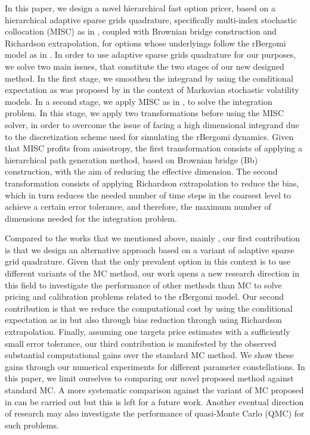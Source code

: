 In this paper,  we design a novel hierarchical fast option pricer,  based on a  hierarchical adaptive sparse grids quadrature, specifically  multi-index stochastic collocation (MISC) as in  \cite{haji2016multi}, coupled with Brownian bridge construction and Richardson extrapolation, for options whose underlyings  follow the rBergomi model as in \cite{bayer2016pricing}.  In order to use adaptive sparse grids quadrature for our purposes, we  solve two main issues, that constitute the two stages of our new designed method. In the first stage, we smoothen the integrand by using the conditional expectation as was proposed by \cite{romano1997contingent} in the context of Markovian stochastic volatility  models.   In a second stage, we apply  MISC as in \cite{haji2016multi}, to solve the integration problem. In this stage, we apply two transformations before using the MISC solver, in order to overcome the issue of facing a high dimensional integrand due to the discretization scheme used for simulating the rBergomi dynamics. Given that MISC profits from anisotropy, the first transformation consists of applying a hierarchical  path generation method, based on Brownian
bridge (Bb) construction, with the aim of reducing the effective dimension. The second transformation consists of applying Richardson extrapolation to reduce the bias, which in turn reduces the needed number of time steps in the coarsest level to achieve a certain error tolerance, and therefore,  the maximum number of dimensions needed for the integration problem.

Compared to the works that we mentioned above, mainly \cite{mccrickerd2017turbocharging}, our first contribution is that we design an alternative approach based on a variant of adaptive sparse grid quadrature. Given that the only prevalent option in this context is to use different variants of the MC method, our work opens a new  research direction in this field to investigate the performance of other methods than MC to solve pricing and calibration problems related to the rBergomi model. Our second contribution is that we reduce the computational cost  by using the conditional expectation as in \cite{mccrickerd2017turbocharging} but also through bias reduction through using Richardson extrapolation. Finally, assuming one targets price estimates with a sufficiently small  error tolerance, our third contribution is manifested by the observed substantial computational gains  over the standard MC method. We show  these gains through our numerical experiments for  different parameter constellations. In this paper, we limit ourselves to comparing our novel proposed method against standard MC. A more systematic comparison against the variant of MC proposed in \cite{mccrickerd2017turbocharging}  can be carried out but this is left for a future work. Another eventual direction of research may also investigate the performance of quasi-Monte Carlo (QMC) for such problems.


